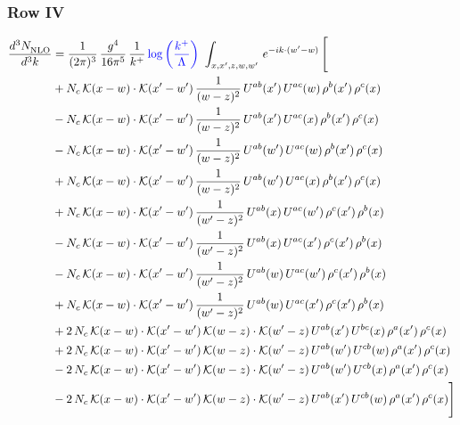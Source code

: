 \documentclass[9pt]{article}
\numberwithin{equation}{section}
\begin{document}
\subsubsection{Row IV}
\begin{align}
    \frac{d^{3}N_{\rm NLO}^{\rm}}{d^{3}k}  & = \frac{1}{(2\pi)^{3}}\,\frac{g^{4}}{16\pi^{5}}\,\frac{1}{k^{+}}\,{\color{blue}\log{\left(\frac{k^{+}}{\Lambda}\right)}}\,\,\int_{x,x',z,w,w'}\,e^{-ik\cdot(w'-w)}\,\Bigg[\notag \\ & +N_{c}\,\mathcal{K}(x-w)\cdot\mathcal{K}(x'-w')\,\frac{1}{(w-z)^{2}}\,U^{ab}(x')\,U^{ac}(w)\,\rho^{b}(x')\,\rho^{c}(x)\notag\\
&-N_{c}\,\mathcal{K}(x-w)\cdot\mathcal{K}(x'-w')\,\frac{1}{(w-z)^{2}}\,U^{ab}(x')\,U^{ac}(x)\,\rho^{b}(x')\,\rho^{c}(x)\notag\\
&-N_{c}\,\mathcal{K}(x-w)\cdot\mathcal{K}(x'-w')\,\frac{1}{(w-z)^{2}}\,U^{ab}(w')\,U^{ac}(w)\,\rho^{b}(x')\,\rho^{c}(x)\notag\\
&+N_{c}\,\mathcal{K}(x-w)\cdot\mathcal{K}(x'-w')\,\frac{1}{(w-z)^{2}}\,U^{ab}(w')\,U^{ac}(x)\,\rho^{b}(x')\,\rho^{c}(x)\notag\\
&+N_{c}\,\mathcal{K}(x-w)\cdot\mathcal{K}(x'-w')\,\frac{1}{(w'-z)^{2}}\,U^{ab}(x)\,U^{ac}(w')\,\rho^{c}(x')\,\rho^{b}(x)\notag\\
&-N_{c}\,\mathcal{K}(x-w)\cdot\mathcal{K}(x'-w')\,\frac{1}{(w'-z)^{2}}\,U^{ab}(x)\,U^{ac}(x')\,\rho^{c}(x')\,\rho^{b}(x)\notag\\
&-N_{c}\,\mathcal{K}(x-w)\cdot\mathcal{K}(x'-w')\,\frac{1}{(w'-z)^{2}}\,U^{ab}(w)\,U^{ac}(w')\,\rho^{c}(x')\,\rho^{b}(x)\notag\\
&+N_{c}\,\mathcal{K}(x-w)\cdot\mathcal{K}(x'-w')\,\frac{1}{(w'-z)^{2}}\,U^{ab}(w)\,U^{ac}(x')\,\rho^{c}(x')\,\rho^{b}(x)\notag\\
&+2\,N_{c}\,\mathcal{K}(x-w)\cdot\mathcal{K}(x'-w')\,\mathcal{K}(w-z)\cdot\mathcal{K}(w'-z)\,U^{ab}(x')\,U^{bc}(x)\,\rho^{a}(x')\,\rho^{c}(x)\notag\\
&+2\,N_{c}\,\mathcal{K}(x-w)\cdot\mathcal{K}(x'-w')\,\mathcal{K}(w-z)\cdot\mathcal{K}(w'-z)\,U^{ab}(w')\,U^{cb}(w)\,\rho^{a}(x')\,\rho^{c}(x)\notag\\
&-2\,N_{c}\,\mathcal{K}(x-w)\cdot\mathcal{K}(x'-w')\,\mathcal{K}(w-z)\cdot\mathcal{K}(w'-z)\,U^{ab}(w')\,U^{cb}(x)\,\rho^{a}(x')\,\rho^{c}(x)\notag\\
&-2\,N_{c}\,\mathcal{K}(x-w)\cdot\mathcal{K}(x'-w')\,\mathcal{K}(w-z)\cdot\mathcal{K}(w'-z)\,U^{ab}(x')\,U^{cb}(w)\,\rho^{a}(x')\,\rho^{c}(x)\Bigg]
\end{align}
\end{document}
